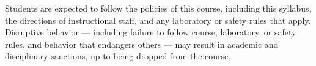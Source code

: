 Students are expected to follow the policies of this course, including this
syllabus, the directions of instructional staff, and any laboratory or safety
rules that apply. Disruptive behavior --- including failure to follow course,
laboratory, or safety rules, and behavior that endangers others --- may result
in academic and disciplinary sanctions, up to being dropped from the course.
